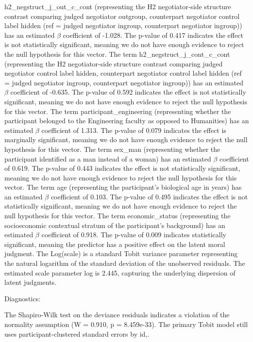 \documentclass[11pt]{article}
\begin{document}
h2\_negstruct\_j\_out\_c\_cont (representing the H2 negotiator-side structure contrast comparing judged negotiator outgroup, counterpart negotiator control label hidden (ref = judged negotiator ingroup, counterpart negotiator ingroup)) has an estimated $\beta$ coefficient of -1.028. The p-value of 0.417 indicates the effect is not statistically significant, meaning we do not have enough evidence to reject the null hypothesis for this vector. The term h2\_negstruct\_j\_cont\_c\_cont (representing the H2 negotiator-side structure contrast comparing judged negotiator control label hidden, counterpart negotiator control label hidden (ref = judged negotiator ingroup, counterpart negotiator ingroup)) has an estimated $\beta$ coefficient of -0.635. The p-value of 0.592 indicates the effect is not statistically significant, meaning we do not have enough evidence to reject the null hypothesis for this vector. The term participant\_engineering (representing whether the participant belonged to the Engineering faculty as opposed to Humanities) has an estimated $\beta$ coefficient of 1.313. The p-value of 0.079 indicates the effect is marginally significant, meaning we do not have enough evidence to reject the null hypothesis for this vector. The term sex\_man (representing whether the participant identified as a man instead of a woman) has an estimated $\beta$ coefficient of 0.619. The p-value of 0.443 indicates the effect is not statistically significant, meaning we do not have enough evidence to reject the null hypothesis for this vector. The term age (representing the participant's biological age in years) has an estimated $\beta$ coefficient of 0.103. The p-value of 0.495 indicates the effect is not statistically significant, meaning we do not have enough evidence to reject the null hypothesis for this vector. The term economic\_status (representing the socioeconomic contextual stratum of the participant's background) has an estimated $\beta$ coefficient of 0.918. The p-value of 0.009 indicates statistically significant, meaning the predictor has a positive effect on the latent moral judgment. The Log(scale) is a standard Tobit variance parameter representing the natural logarithm of the standard deviation of the unobserved residuals. The estimated scale parameter log is 2.445, capturing the underlying dispersion of latent judgments.

Diagnostics:

The Shapiro-Wilk test on the deviance residuals indicates a violation of the normality assumption (W = 0.910, p = 8.459e-33). The primary Tobit model still uses participant-clustered standard errors by id,.
\end{document}

